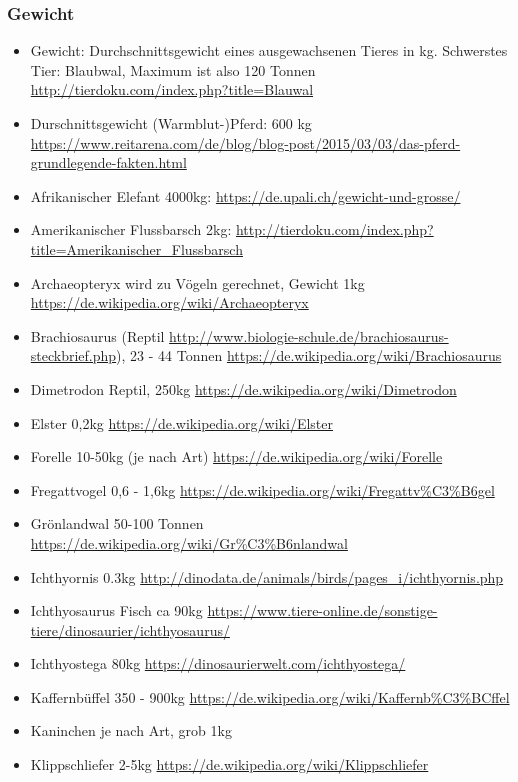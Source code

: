  \subsubsection{Gewicht}
 \begin{itemize}
  \item Gewicht: Durchschnittsgewicht eines ausgewachsenen Tieres in kg. Schwerstes Tier: Blaubwal, Maximum ist also 120 Tonnen \url{http://tierdoku.com/index.php?title=Blauwal}
  \item Durschnittsgewicht (Warmblut-)Pferd: 600 kg \url{https://www.reitarena.com/de/blog/blog-post/2015/03/03/das-pferd-grundlegende-fakten.html}
  \item Afrikanischer Elefant 4000kg: \url{https://de.upali.ch/gewicht-und-grosse/}
  \item Amerikanischer Flussbarsch 2kg: \url{http://tierdoku.com/index.php?title=Amerikanischer_Flussbarsch}
  \item Archaeopteryx wird zu Vögeln gerechnet, Gewicht 1kg \url{https://de.wikipedia.org/wiki/Archaeopteryx}
  \item Brachiosaurus (Reptil \url{http://www.biologie-schule.de/brachiosaurus-steckbrief.php}), 23 - 44 Tonnen \url{https://de.wikipedia.org/wiki/Brachiosaurus}
  \item Dimetrodon Reptil, 250kg \url{https://de.wikipedia.org/wiki/Dimetrodon}
  \item Elster 0,2kg \url{https://de.wikipedia.org/wiki/Elster}
  \item Forelle 10-50kg (je nach Art) \url{https://de.wikipedia.org/wiki/Forelle}
  \item Fregattvogel 0,6 - 1,6kg \url{https://de.wikipedia.org/wiki/Fregattv\%C3\%B6gel}
  \item Grönlandwal 50-100 Tonnen \url{https://de.wikipedia.org/wiki/Gr\%C3\%B6nlandwal}
  \item Ichthyornis 0.3kg \url{http://dinodata.de/animals/birds/pages_i/ichthyornis.php}
  \item Ichthyosaurus Fisch ca 90kg \url{https://www.tiere-online.de/sonstige-tiere/dinosaurier/ichthyosaurus/}
  \item Ichthyostega 80kg \url{https://dinosaurierwelt.com/ichthyostega/}
  \item Kaffernbüffel 350 - 900kg \url{https://de.wikipedia.org/wiki/Kaffernb\%C3\%BCffel}
  \item Kaninchen je nach Art, grob 1kg
  \item Klippschliefer 2-5kg \url{https://de.wikipedia.org/wiki/Klippschliefer}

\end{itemize}
